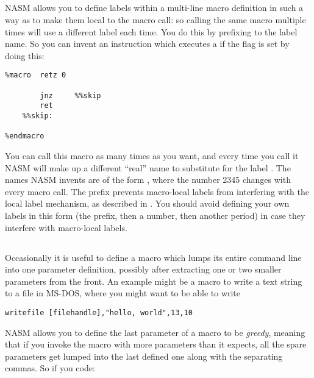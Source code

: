\subsection{}
\label{subsec:maclocal}

NASM allows you to define labels within a multi-line macro definition
in such a way as to make them local to the macro call: so calling
the same macro multiple times will use a different label each time.
You do this by prefixing \codeindex{\%\%} to the label name.
So you can invent an instruction which executes a  if the
 flag is set by doing this:

\begin{lstlisting}
%macro  retz 0

        jnz     %%skip
        ret
    %%skip:

%endmacro
\end{lstlisting}

You can call this macro as many times as you want, and every time
you call it NASM will make up a different ``real'' name to substitute
for the label . The names NASM invents are of the form
, where the number 2345 changes with every macro
call. The  prefix prevents macro-local labels from
interfering with the local label mechanism, as described in
. You should avoid defining your own labels
in this form (the  prefix, then a number, then another period)
in case they interfere with macro-local labels.

\subsection{}
\label{subsec:mlmacgre}

Occasionally it is useful to define a macro which lumps its entire
command line into one parameter definition, possibly after
extracting one or two smaller parameters from the front. An example
might be a macro to write a text string to a file in MS-DOS, where
you might want to be able to write

\begin{lstlisting}
writefile [filehandle],"hello, world",13,10
\end{lstlisting}

NASM allows you to define the last parameter of a macro to be
\emph{greedy}, meaning that if you invoke the macro with more
parameters than it expects, all the spare parameters get lumped into
the last defined one along with the separating commas. So if you
code:

